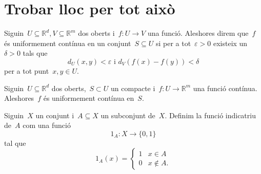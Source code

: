 \documentclass[../../main.tex]{subfiles}
\begin{document}
\section{Trobar lloc per tot això}
	\begin{definition}
		\label{def:obert CDVO}
		\label{def:tancat CDVO}\label{conjunt obert, tancat...}\label{todo:conjunt definit per desigualtats estrictes és compacte}
	\end{definition}
	\begin{definition}
		\label{def:uniformement contínua}
		Siguin~\(U\subseteq\mathbb{R}^{d},V\subseteq\mathbb{R}^{m}\) dos oberts i~\(f\colon U\to V\) una funció.
		Aleshores direm que~\(f\) és uniformement contínua en un conjunt~\(S\subseteq U\) si per a tot~\(\varepsilon>0\) existeix un~\(\delta>0\) tals que
		\[d_{U}(x,y)<\varepsilon\text{ i }d_{V}(f(x)-f(y))<\delta\]
		per a tot punt~\(x,y\in U\).
	\end{definition}
	\begin{theorem}
		\label{thm:Teorema de Heine}
		Siguin~\(U\subseteq\mathbb{R}^{d}\) dos oberts,~\(S\subset U\) un compacte i~\(f\colon U\to\mathbb{R}^{m}\) una funció contínua.
		Aleshores~\(f\) és uniformement contínua en~\(S\).
	\end{theorem}
	\begin{definition}
		\label{def:funció indicatriu}
		Siguin~\(X\) un conjunt i~\(A\subseteq X\) un subconjunt de~\(X\).
		Definim la funció indicatriu de~\(A\) com una funció
		\[1_{A}\colon X\longrightarrow\{0,1\}\]
		tal que
		\begin{displaymath}
		1_{A}(x)=\begin{cases}
		1 & x\in A \\
		0 & x\notin A.
		\end{cases}
		\end{displaymath}
	\end{definition}
\end{document}
